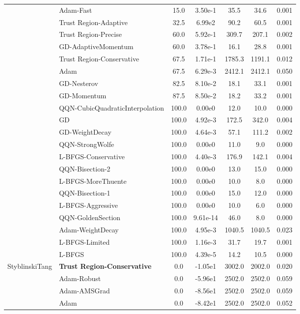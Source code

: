 \documentclass{article}
\begin{document}
\begin{table}[htbp]
{\begin{tabular}{p{2.5cm}p{2.5cm}*{5}{c}}
 & Adam-Fast & 15.0 & 3.50e-1 & 35.5 & 34.6 & 0.001 \\
 & Trust Region-Adaptive & 32.5 & 6.99e2 & 90.2 & 60.5 & 0.001 \\
 & Trust Region-Precise & 60.0 & 5.92e-1 & 309.7 & 207.1 & 0.002 \\
 & GD-AdaptiveMomentum & 60.0 & 3.78e-1 & 16.1 & 28.8 & 0.001 \\
 & Trust Region-Conservative & 67.5 & 1.71e-1 & 1785.3 & 1191.1 & 0.012 \\
 & Adam & 67.5 & 6.29e-3 & 2412.1 & 2412.1 & 0.050 \\
 & GD-Nesterov & 82.5 & 8.10e-2 & 18.1 & 33.1 & 0.001 \\
 & GD-Momentum & 87.5 & 8.50e-2 & 18.2 & 33.2 & 0.001 \\
 & QQN-CubicQuadraticInterpolation & 100.0 & 0.00e0 & 12.0 & 10.0 & 0.000 \\
 & GD & 100.0 & 4.92e-3 & 172.5 & 342.0 & 0.004 \\
 & GD-WeightDecay & 100.0 & 4.64e-3 & 57.1 & 111.2 & 0.002 \\
 & QQN-StrongWolfe & 100.0 & 0.00e0 & 11.0 & 9.0 & 0.000 \\
 & L-BFGS-Conservative & 100.0 & 4.40e-3 & 176.9 & 142.1 & 0.004 \\
 & QQN-Bisection-2 & 100.0 & 0.00e0 & 13.0 & 15.0 & 0.000 \\
 & L-BFGS-MoreThuente & 100.0 & 0.00e0 & 10.0 & 8.0 & 0.000 \\
 & QQN-Bisection-1 & 100.0 & 0.00e0 & 15.0 & 12.0 & 0.000 \\
 & L-BFGS-Aggressive & 100.0 & 0.00e0 & 10.0 & 6.0 & 0.000 \\
 & QQN-GoldenSection & 100.0 & 9.61e-14 & 46.0 & 8.0 & 0.000 \\
 & Adam-WeightDecay & 100.0 & 4.95e-3 & 1040.5 & 1040.5 & 0.023 \\
 & L-BFGS-Limited & 100.0 & 1.16e-3 & 31.7 & 19.7 & 0.001 \\
 & L-BFGS & 100.0 & 4.39e-5 & 14.2 & 10.5 & 0.000 \\
\midrule
\multirow{25}{*}{StyblinskiTang} & \textbf{Trust Region-Conservative} & 0.0 & -1.05e1 & 3002.0 & 2002.0 & 0.020 \\
 & Adam-Robust & 0.0 & -5.96e1 & 2502.0 & 2502.0 & 0.059 \\
 & Adam-AMSGrad & 0.0 & -8.56e1 & 2502.0 & 2502.0 & 0.059 \\
 & Adam & 0.0 & -8.42e1 & 2502.0 & 2502.0 & 0.052 \\

\end{tabular}}
\end{table}
\end{document}
